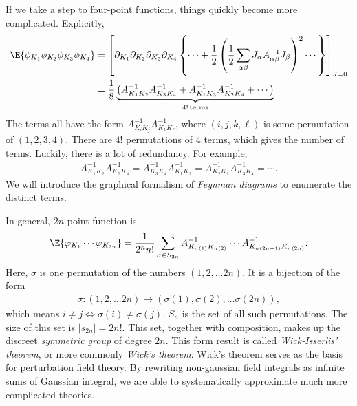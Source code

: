 If we take a step to four-point functions, things quickly become more complicated.
Explicitly,
%
\begin{align}
    \E{\phi_{K_1} \phi_{K_2} \phi_{K_3} \phi_{K_4}} 
    &
    = 
    \left[
        \partial_{K_1} \partial_{K_2} \partial_{K_3} \partial_{K_4}
        \left\{
            \cdots
            + \frac{ 1 }{ 2 } \left(\frac{1}{2}\sum_{\alpha \beta} J_\alpha A_{\alpha \beta}^{-1} J_\beta\right)^2
            \cdots
        \right\}
    \right]_{J = 0} \\
    & = \frac{1}{8}
    \underbrace{
        \left(  A_{K_1 K_2}^{-1} A_{K_3 K_4}^{-1} +  A_{K_1 K_3}^{-1} A_{K_2 K_4}^{-1}  + \cdots\right)
    }_{4! \, \mathrm{terms}}.
\end{align}
%
The terms all have the form $A_{K_i K_j}^{-1} A_{K_k K_\ell}^{-1}$, where $(i,j,k,\ell)$ is some permutation of $(1,2,3,4)$.
There are $4!$ permutations of $4$ terms, which gives the number of terms.
Luckily, there is a lot of redundancy.
For example,
%
\begin{align}
    A_{K_1 K_2}^{-1} A_{K_3 K_4}^{-1} 
    = A_{K_3 K_4}^{-1} A_{K_1 K_2}^{-1} 
    = A_{K_2 K_1}^{-1} A_{K_3 K_4}^{-1} 
    = \cdots.
\end{align}
%
We will introduce the graphical formalism of \emph{Feynman diagrams} to enumerate the distinct terms.

In general, $2n$-point function is
%
\begin{align}\label{eq: Wicks theorem}
    \E{\varphi_{K_1 } \cdots \varphi_{K_{2n}} }
    = 
    \frac{1}{2^n n!} \sum_{\sigma \in S_{2n}}
    A^{-1}_{K_{\sigma(1)} K_{\sigma(2)}} \cdots A^{-1}_{K_{\sigma(2n-1)} K_{\sigma(2n)}}.
\end{align}
%
Here, $\sigma$ is one permutation of the numbers $(1, 2, \dots 2n)$.
It is a bijection of the form
%
\begin{align}
    \sigma : (1, 2, \dots 2n) \longrightarrow (\sigma(1), \sigma(2), \dots \sigma(2n)),
\end{align}
%
which means $i \neq j \Leftrightarrow \sigma(i) \neq \sigma(j)$.
$S_n$ is the set of all such permutations.
The size of this set is $|s_{2n}| = 2n!$.
This set, together with composition, makes up the discreet \emph{symmetric group} of degree $2n$.
This form result is called \emph{Wick-Isserlis' theorem}, or more commonly \emph{Wick's theorem}.
Wick's theorem serves as the basis for perturbation field theory.
By rewriting non-gaussian field integrals as infinite sums of Gaussian integral, we are able to systematically approximate much more complicated theories.

